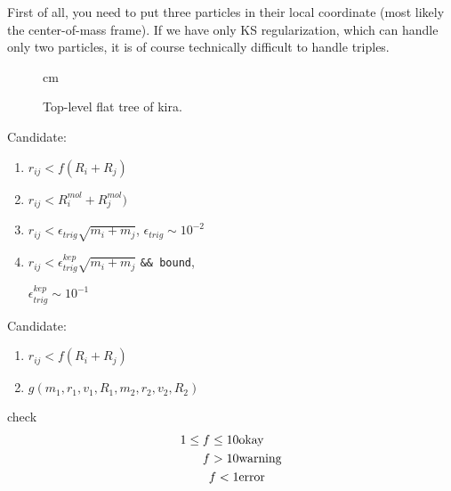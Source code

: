 \documentclass{article}[12pt]
\begin{document}
First of all, you need to put three particles in their local
coordinate (most likely the center-of-mass frame). If we have only KS
regularization, which can handle only two particles, it is of course
technically difficult to handle triples.




\begin{figure}
\begin{center}
\leavevmode
{} cm
\end{center}
\caption{Top-level flat tree of kira.}
\label{fig:kira-flat-tree}
\end{figure}








\large
\begin{minipage}[b]{7.9cm}

\noindent
Candidate:
\begin{enumerate}
\item $ r_{ij} < f(R_i+R_j)$
\item $ r_{ij} < R_i^{mol}+R_j^{mol})$
\item $ r_{ij} < \epsilon_{trig}\sqrt{m_i+m_j}$, $\epsilon_{trig} \sim 10^{-2}$
\item $ r_{ij} < \epsilon_{trig}^{kep}\sqrt{m_i+m_j}$ {\tt \&\&
bound},

$\epsilon_{trig}^{kep} \sim 10^{-1}$
\end{enumerate}

\end{minipage}
\begin{minipage}[b]{7.9cm}
Candidate:
\begin{enumerate}
\item $ r_{ij} < f(R_i+R_j)$
\item $g(m_{1},r_{1},v_{1},R_{1}, m_{2},r_{2},v_{2},R_{2})$

\end{enumerate}
\end{minipage}


\epsfxsize \columnwidth
{}

\begin{center}
check
\begin{eqnarray}
1\le f \le 10 & {\rm okay}\nonumber\\
 f > 10 & {\rm warning}\nonumber\\
 f < 1 & {\rm error}\nonumber
\end{eqnarray}
\end{center}
\end{document}
